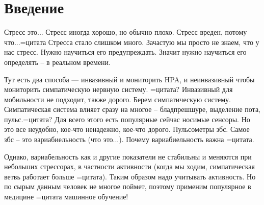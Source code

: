 \documentclass[14pt]{matmex-diploma-custom}
\begin{document}
\maketitle
\tableofcontents

\section*{Введение}



Стресс это... Стресс иногда хорошо, но обычно плохо. Стресс вреден, потому
что...=цитата Стресса стало слишком много. Зачастую мы просто не знаем, что у
нас стресс. Нужно научиться его предупреждать. Значит нужно научиться его
определять -- в реальном времени.

Тут есть два способа --- инвазивный и мониторить HPA, и неинвазивный чтобы
мониторить симпатическую нервную систему. =цитата? Инвазивный для мобильности не
подходит, также дорого. Берем симпатическую систему. Симпатическая система
влияет сразу на многое -- бладпрешшуре, выделение пота, пульс.=цитата? Для всего
этого есть популярные сейчас носимые сенсоры. Но это все неудобно, кое-что
ненадежно, кое-что дорого. Пульсометры збс. Самое збс -- это вариабиельность
(что это...). Почему вариабиельность важна =цитата.

Однако, вариабельность как и другие показатели не стабильны и меняются при
небольших стрессорах, в частности активности (когда мы ходим, симпатическая
ветвь работает больше =цитата). Таким образом надо учитывать активность. Но по
сырым данным человек не многое поймет, поэтому применим популярное в медицине
=цитата машинное обучение!
\end{document}
